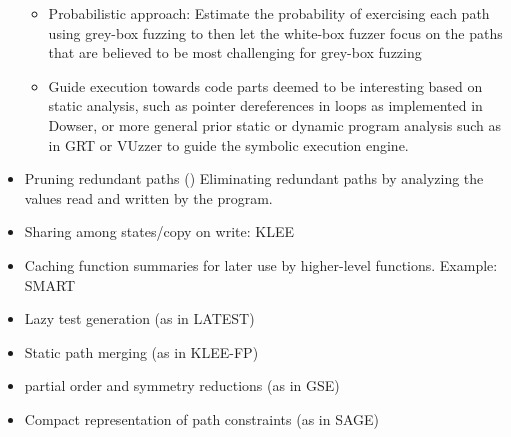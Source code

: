 \documentclass{article}
\begin{document}
\begin{multicols}{2}
\begin{itemize}
\begin{itemize}
                  \item Probabilistic approach: Estimate the probability of exercising each path using grey-box fuzzing to then let the white-box fuzzer focus on the paths that are believed to be most challenging for grey-box fuzzing\cite{DigFuzz}
                  \item Guide execution towards code parts deemed to be interesting based on static analysis, such as pointer dereferences in loops as implemented in Dowser\cite{Dowser}, or more general prior static or dynamic program analysis such as in GRT\cite{GRT} or VUzzer\cite{VUzzer} to guide the symbolic execution engine.
              \end{itemize}
        \item Pruning redundant paths (\cite{RWset}) Eliminating redundant paths by analyzing the values read and written by the program.
        \item Sharing among states/copy on write: KLEE\cite{KLEE}
        \item Caching function summaries for later use by higher-level functions. Example: SMART\cite{SMART}
        \item Lazy test generation (as in LATEST\cite{LATEST})
        \item Static path merging (as in KLEE-FP\cite{KLEEFP})
        \item partial order and symmetry reductions (as in GSE\cite{GSE})
        \item Compact representation of path constraints (as in SAGE\cite{SAGE})
    \end{itemize}


\end{multicols}
\end{document}
